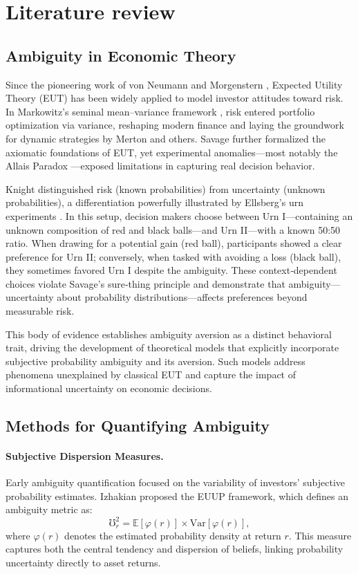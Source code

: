 \documentclass[preprint,12pt,authoryear]{elsarticle}
\begin{document}
\section{Literature review}

\subsection{Ambiguity in Economic Theory}
Since the pioneering work of von Neumann and Morgenstern \cite{neumann1947}, Expected Utility Theory (EUT) has been widely applied to model investor attitudes toward risk. In Markowitz's seminal mean–variance framework \cite{markowitz1952}, risk entered portfolio optimization via variance, reshaping modern finance and laying the groundwork for dynamic strategies by Merton \cite{merton1971} and others. Savage \cite{savage1954} further formalized the axiomatic foundations of EUT, yet experimental anomalies—most notably the Allais Paradox \cite{allais1953}—exposed limitations in capturing real decision behavior.

Knight \cite{knight1921} distinguished risk (known probabilities) from uncertainty (unknown probabilities), a differentiation powerfully illustrated by Ellsberg's urn experiments \cite{ellsberg1961}. In this setup, decision makers choose between Urn I—containing an unknown composition of red and black balls—and Urn II—with a known 50:50 ratio. When drawing for a potential gain (red ball), participants showed a clear preference for Urn II; conversely, when tasked with avoiding a loss (black ball), they sometimes favored Urn I despite the ambiguity. These context‑dependent choices violate Savage's sure‑thing principle and demonstrate that ambiguity—uncertainty about probability distributions—affects preferences beyond measurable risk.

This body of evidence establishes ambiguity aversion as a distinct behavioral trait, driving the development of theoretical models that explicitly incorporate subjective probability ambiguity and its aversion. Such models address phenomena unexplained by classical EUT and capture the impact of informational uncertainty on economic decisions.


\subsection{Methods for Quantifying Ambiguity}

\paragraph{Subjective Dispersion Measures.} Early ambiguity quantification focused on the variability of investors' subjective probability estimates. Izhakian \cite{izhakian2020} proposed the EUUP framework, which defines an ambiguity metric as:
\begin{equation}
\mho^2_r = \mathbb{E}[\varphi(r)] \times \mathrm{Var}[\varphi(r)],
\end{equation}
where $\varphi(r)$ denotes the estimated probability density at return $r$. This measure captures both the central tendency and dispersion of beliefs, linking probability uncertainty directly to asset returns.
\end{document}
